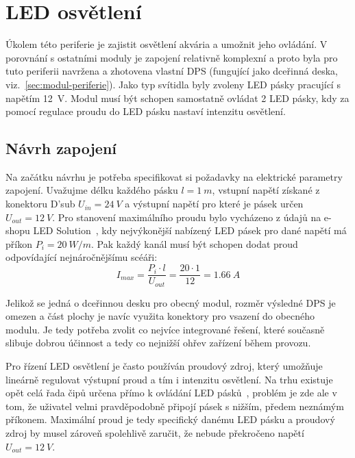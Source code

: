 \section{LED osvětlení}
\label{sec:perif-led-osvetleni}

    Úkolem této periferie je zajistit osvětlení akvária a umožnit jeho ovládání. V porovnání s ostatními moduly je zapojení relativně komplexní a proto byla pro tuto periferii navržena a zhotovena vlastní DPS (fungující jako dceřinná deska, viz.~\ref{sec:modul-periferie}). Jako typ svítidla byly zvoleny LED pásky pracující s napětím \qty{12}{V}. Modul musí být schopen samostatně ovládat 2 LED pásky, kdy za pomocí regulace proudu do LED pásku nastaví intenzitu osvětlení. 

\subsection{Návrh zapojení}
    Na začátku návrhu je potřeba specifikovat si požadavky na elektrické parametry zapojení. Uvažujme délku každého pásku \(l=\qty{1}{m}\), vstupní napětí získané z konektoru D'sub \(U_{in} =\qty{24}{V}\) a výstupní napětí pro které je pásek určen \(U_{out} =\qty{12}{V}\). Pro stanovení maximálního proudu bylo vycházeno z údajů na e-shopu LED Solution~\cite{eshop-ledsolution-svetlo}, kdy nejvýkonější nabízený LED pásek pro dané napětí má příkon \(P_{i}= \qty{20}{W/m}\). Pak každý kanál musí být schopen dodat proud odpovídající nejnáročnějšímu scéáři:
    \begin{equation}  
        I_{max} = \frac{P_{i}\cdot l }{U_{out}} = \frac{20\cdot 1 }{12} = \qty{1.66}{A}
    \end{equation}

    Jelikož se jedná o dceřinnou desku pro obecný modul, rozměr výsledné DPS je omezen a část plochy je navíc využita konektory pro vsazení do obecného modulu. Je tedy potřeba zvolit co nejvíce integrované řešení, které současně slibuje dobrou účinnost a tedy co nejnižší ohřev zařízení během provozu.

    Pro řízení LED osvětlení je často používán proudový zdroj, který umožňuje lineárně regulovat výstupní proud a tím i intenzitu osvětlení. Na trhu existuje opět celá řada čipů určena přímo k ovládání LED pásků~\cite{TI_LED_Drivers}, problém je zde ale v tom, že uživatel velmi pravděpodobně připojí pásek s nižším, předem neznámým příkonem. Maximální proud je tedy specifický danému LED pásku a proudový zdroj by musel zároveň spolehlivě zaručit, že nebude překročeno napětí \(U_{out} =\qty{12}{V} \).

